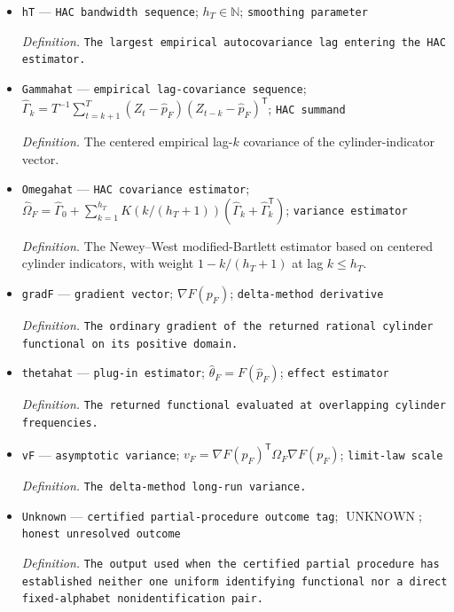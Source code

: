 \documentclass{article}
\begin{document}
\begin{itemize}
  \item \texttt{hT} --- \texttt{HAC bandwidth sequence}; \(h_T\in\mathbb N\); \texttt{smoothing parameter}
  \par\smallskip\noindent\emph{Definition.} \texttt{The largest empirical autocovariance lag entering the HAC estimator.}
  \item \texttt{Gammahat} --- \texttt{empirical lag-\allowbreak{}covariance sequence}; \(\widehat\Gamma_k=T^{-1}\sum_{t=k+1}^{T}(Z_t-\widehat p_F)(Z_{t-k}-\widehat p_F)^{\mathsf T}\); \texttt{HAC summand}
  \par\smallskip\noindent\emph{Definition.} The centered empirical lag-\(k\) covariance of the cylinder-indicator vector.
  \item \texttt{Omegahat} --- \texttt{HAC covariance estimator}; \(\widehat\Omega_F=\widehat\Gamma_0+\sum_{k=1}^{h_T}K(k/(h_T+1))(\widehat\Gamma_k+\widehat\Gamma_k^{\mathsf T})\); \texttt{variance estimator}
  \par\smallskip\noindent\emph{Definition.} The Newey--West modified-Bartlett estimator based on centered cylinder indicators, with weight \(1-k/(h_T+1)\) at lag \(k\le h_T\).
  \item \texttt{gradF} --- \texttt{gradient vector}; \(\nabla F(p_F)\); \texttt{delta-\allowbreak{}method derivative}
  \par\smallskip\noindent\emph{Definition.} \texttt{The ordinary gradient of the returned rational cylinder functional on its positive domain.}
  \item \texttt{thetahat} --- \texttt{plug-\allowbreak{}in estimator}; \(\widehat\theta_F=F(\widehat p_F)\); \texttt{effect estimator}
  \par\smallskip\noindent\emph{Definition.} \texttt{The returned functional evaluated at overlapping cylinder frequencies.}
  \item \texttt{vF} --- \texttt{asymptotic variance}; \(v_F=\nabla F(p_F)^{\mathsf T}\Omega_F\nabla F(p_F)\); \texttt{limit-\allowbreak{}law scale}
  \par\smallskip\noindent\emph{Definition.} \texttt{The delta-\allowbreak{}method long-\allowbreak{}run variance.}
  \item \texttt{Unknown} --- \texttt{certified partial-\allowbreak{}procedure outcome tag}; \(\operatorname{UNKNOWN}\); \texttt{honest unresolved outcome}
  \par\smallskip\noindent\emph{Definition.} \texttt{The output used when the certified partial procedure has established neither one uniform identifying functional nor a direct fixed-\allowbreak{}alphabet nonidentification pair.}

\end{itemize}
\end{document}
